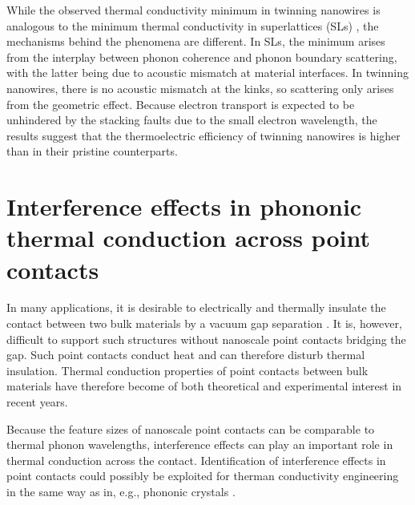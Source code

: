 While the observed thermal conductivity minimum in twinning nanowires is analogous to the minimum thermal conductivity in superlattices (SLs) \cite{simkin00}, the mechanisms behind the phenomena are different. In SLs, the minimum arises from the interplay between phonon coherence and phonon boundary scattering, with the latter being due to acoustic mismatch at material interfaces. In twinning nanowires, there is no acoustic mismatch at the kinks, so scattering only arises from the geometric effect. Because electron transport is expected to be unhindered by the stacking faults due to the small electron wavelength, the results suggest that the thermoelectric efficiency of twinning nanowires is higher than in their pristine counterparts. %


\section{Interference effects in phononic thermal conduction across point contacts}
\label{sec:results_interference}

In many applications, it is desirable to electrically and thermally insulate the contact between two bulk materials by a vacuum gap separation \cite{}. It is, however, difficult to support such structures without nanoscale point contacts bridging the gap. Such point contacts conduct heat and can therefore disturb thermal insulation. Thermal conduction properties of point contacts between bulk materials have therefore become of both theoretical \cite{} and experimental \cite{bartsch12} interest in recent years. 

Because the feature sizes of nanoscale point contacts can be comparable to thermal phonon wavelengths, interference effects can play an important role in thermal conduction across the contact. Identification of interference effects in point contacts could possibly be exploited for therman conductivity engineering in the same way as in, e.g., phononic crystals \cite{maldovan13}. %

